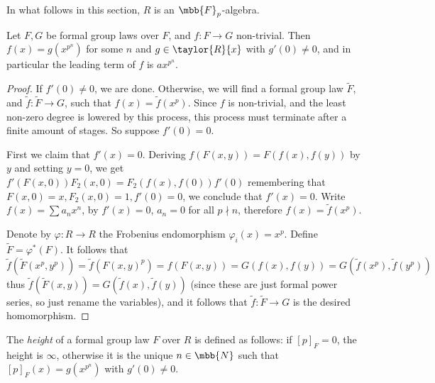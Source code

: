 In what follows in this section, $R$ is an $\mbb{F}_p$-algebra.

\begin{lemma*}
	Let $F,G$ be formal group laws over $F$, and $f: F \to G$ non-trivial.
	Then $f\left(x\right) = g\left(x^{p^n}\right)$ for some $n$ and $g\in \taylor{R}{x}$ with $g'\left(0\right) \neq 0$, and in particular the leading term of $f$ is $ax^{p^n}$.
\end{lemma*}

\begin{proof}
	If $f'\left(0\right) \neq 0$, we are done.
	Otherwise, we will find a formal group law $\tilde{F}$, and $\tilde{f}: \tilde{F} \to G$, such that $f\left(x\right) = \tilde{f}\left(x^p\right)$. Since $f$ is non-trivial, and the least non-zero degree is lowered by this process, this process must terminate after a finite amount of stages.
	So suppose $f'\left(0\right) = 0$.
	
	First we claim that $f'\left(x\right) = 0$.
	Deriving $f\left(F\left(x,y\right)\right) = F\left(f\left(x\right),f\left(y\right)\right)$ by $y$ and setting $y=0$, we get
	$
		f'\left(F\left(x,0\right)\right) F_2\left(x,0\right)
		= F_2\left(f\left(x\right),f\left(0\right)\right) f'\left(0\right)
	$
	remembering that $F\left(x,0\right) = x, F_2\left(x,0\right) = 1, f'\left(0\right) = 0$,
	we conclude that $f'\left(x\right) = 0$.
	Write $f\left(x\right) = \sum a_n x^n$,
	by $f'\left(x\right) = 0$, $a_n = 0$ for all $p \nmid n$,
	therefore $f\left(x\right) = \tilde{f}\left(x^p\right)$.
	
	Denote by $\varphi: R \to R$ the Frobenius endomorphism $\varphi_i\left(x\right) = x^p$.
	Define $\tilde{F} = \varphi^*\left(F\right)$.
	It follows that
	$$
		\tilde{f}\left(\tilde{F}\left(x^p, y^p\right)\right)
		= \tilde{f}\left(F\left(x, y\right)^p\right)
		= f\left(F\left(x, y\right)\right)
		= G\left(f\left(x\right),f\left(y\right)\right)
		= G\left(\tilde{f}\left(x^p\right),\tilde{f}\left(y^p\right)\right)
	$$
	thus
	$
		\tilde{f}\left(\tilde{F}\left(x, y\right)\right)
		= G\left(\tilde{f}\left(x\right),\tilde{f}\left(y\right)\right)
	$
	(since these are just formal power series, so just rename the variables),
	and it follows that $\tilde{f}: \tilde{F} \to G$ is the desired homomorphism.
\end{proof}

\begin{definition*}
	The \emph{height} of a formal group law $F$ over $R$ is defined as follows:
	if $\left[p\right]_F = 0$, the height is $\infty$,
	otherwise it is the unique $n \in \mbb{N}$ such that $\left[p\right]_F\left(x\right) = g\left(x^{p^n}\right)$ with $g'\left(0\right) \neq 0$.
\end{definition*}

